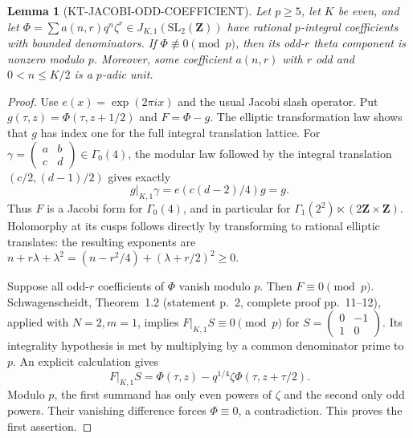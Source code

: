 \documentclass[11pt,a4paper]{article}
\newtheorem{lemma}[theorem]{Lemma}
\theoremstyle{definition}
\begin{document}
\begin{lemma}[KT-JACOBI-ODD-COEFFICIENT]
Let $p\geq5$, let $K$ be even, and let
$\Phi=\sum a(n,r)q^n\zeta^r\in J_{K,1}(\mathrm{SL}_2(\mathbf Z))$
have rational $p$-integral coefficients with bounded denominators.
If $\Phi\not\equiv0\pmod p$, then its odd-$r$ theta component is
nonzero modulo $p$.  Moreover, some coefficient $a(n,r)$ with $r$ odd
and $0<n\leq K/2$ is a $p$-adic unit.
\end{lemma}
\begin{proof}
Use $e(x)=\exp(2\pi i x)$ and the usual Jacobi slash operator.
Put $g(\tau,z)=\Phi(\tau,z+1/2)$ and $F=\Phi-g$.
The elliptic transformation law shows that $g$ has index one for
the full integral translation lattice.  For
$\gamma=\left(\begin{smallmatrix}a&b\\c&d\end{smallmatrix}\right)
\in\Gamma_0(4)$, the modular law followed by the integral translation
$(c/2,(d-1)/2)$ gives exactly
\[
                   g|_{K,1}\gamma=e(c(d-2)/4)g=g.       \tag{JF.2}
\]
Thus $F$ is a Jacobi form for $\Gamma_0(4)$, and in particular for
$\Gamma_1(2^2)\ltimes(2\mathbf Z\times\mathbf Z)$.
Holomorphy at its cusps follows directly by transforming to rational
elliptic translates: the resulting exponents are
$n+r\lambda+\lambda^2=(n-r^2/4)+(\lambda+r/2)^2\geq0$.

Suppose all odd-$r$ coefficients of $\Phi$ vanish modulo $p$.
Then $F\equiv0\pmod p$.  Schwagenscheidt, Theorem~1.2
(statement p.~2, complete proof pp.~11--12), applied with $N=2,m=1$,
implies $F|_{K,1}S\equiv0\pmod p$ for
$S=\left(\begin{smallmatrix}0&-1\\1&0\end{smallmatrix}\right)$.
Its integrality hypothesis is met by multiplying by a common
denominator prime to $p$.  An explicit calculation gives
\[
 F|_{K,1}S=\Phi(\tau,z)
       -q^{1/4}\zeta\Phi(\tau,z+\tau/2).                \tag{JF.3}
\]
Modulo $p$, the first summand has only even powers of $\zeta$ and
the second only odd powers.  Their vanishing difference forces
$\Phi\equiv0$, a contradiction.  This proves the first assertion.


\end{proof}
\end{document}
